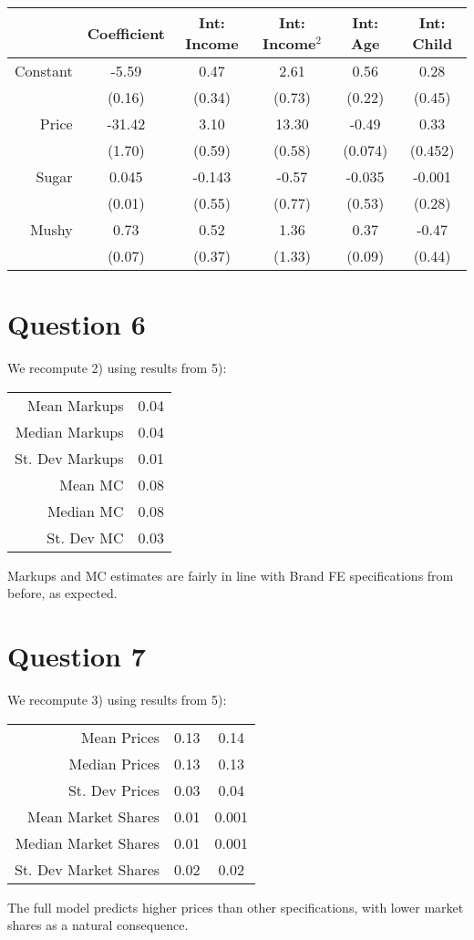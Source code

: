 \documentclass[11pt]{article} %
\begin{document}
\begin{center}
\begin{tabular}{r |c c c c c}
\hline \hline
 & Coefficient & Int: Income & Int: Income$^2$ & Int: Age & Int: Child\\
\hline
Constant & -5.59 & 0.47 & 2.61 & 0.56 & 0.28 \\
 & (0.16) & (0.34) & (0.73) & (0.22) & (0.45) \\
Price & -31.42 & 3.10 & 13.30 & -0.49 & 0.33 \\
 & (1.70) & (0.59) & (0.58) & (0.074) & (0.452) \\
Sugar & 0.045 & -0.143 & -0.57 & -0.035 & -0.001\\
 & (0.01) & (0.55) & (0.77) & (0.53) & (0.28) \\
Mushy & 0.73 & 0.52 & 1.36 & 0.37 & -0.47 \\
 & (0.07) & (0.37) & (1.33) & (0.09) & (0.44) \\
\hline
\end{tabular}
\end{center}

\section{Question 6}
We recompute 2) using results from 5):

\begin{center}
\begin{tabular}{r |c }
\hline \hline
Mean Markups & 0.04 \\
Median Markups & 0.04 \\
St. Dev Markups & 0.01\\
Mean MC & 0.08 \\
Median MC & 0.08\\
St. Dev MC & 0.03\\
\hline
\end{tabular}
\end{center}
Markups and MC estimates are fairly in line with Brand FE specifications from before, as expected.

\section{Question 7}
We recompute 3) using results from 5):

\begin{center}
\begin{tabular}{r |c c}
\hline \hline
Mean Prices & 0.13 & 0.14 \\
Median Prices & 0.13 & 0.13 \\
St. Dev Prices & 0.03 & 0.04\\
Mean Market Shares & 0.01 & 0.001 \\
Median Market Shares & 0.01 & 0.001\\
St. Dev Market Shares & 0.02 & 0.02 \\
\hline
\end{tabular}
\end{center}
The full model predicts higher prices than other specifications, with lower market shares as a natural consequence. 
\end{document}
